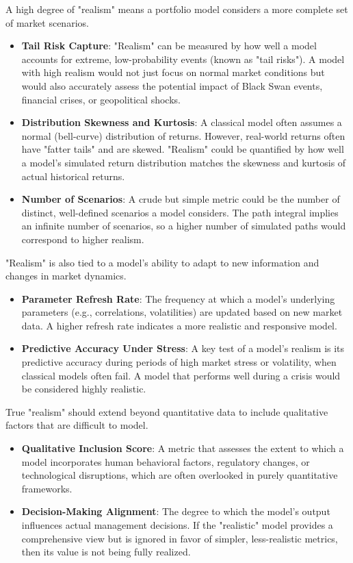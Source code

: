 \documentclass{article}
\begin{document}
 
 A high degree of "realism" means a portfolio model considers a more complete set of market scenarios.
 \begin{itemize}
 	\item \textbf{Tail Risk Capture}: "Realism" can be measured by how well a model accounts for extreme, low-probability events (known as "tail risks"). A model with high realism would not just focus on normal market conditions but would also accurately assess the potential impact of Black Swan events, financial crises, or geopolitical shocks.
 	\item \textbf{Distribution Skewness and Kurtosis}: A classical model often assumes a normal (bell-curve) distribution of returns. However, real-world returns often have "fatter tails" and are skewed. "Realism" could be quantified by how well a model's simulated return distribution matches the skewness and kurtosis of actual historical returns.
 	\item \textbf{Number of Scenarios}: A crude but simple metric could be the number of distinct, well-defined scenarios a model considers. The path integral implies an infinite number of scenarios, so a higher number of simulated paths would correspond to higher realism.
 \end{itemize}
 "Realism" is also tied to a model's ability to adapt to new information and changes in market dynamics.
 \begin{itemize}
 	\item \textbf{Parameter Refresh Rate}: The frequency at which a model's underlying parameters (e.g., correlations, volatilities) are updated based on new market data. A higher refresh rate indicates a more realistic and responsive model.
 	\item \textbf{Predictive Accuracy Under Stress}: A key test of a model's realism is its predictive accuracy during periods of high market stress or volatility, when classical models often fail. A model that performs well during a crisis would be considered highly realistic.
 \end{itemize}
 True "realism" should extend beyond quantitative data to include qualitative factors that are difficult to model.
 \begin{itemize}
 	\item \textbf{Qualitative Inclusion Score}: A metric that assesses the extent to which a model incorporates human behavioral factors, regulatory changes, or technological disruptions, which are often overlooked in purely quantitative frameworks.
 	\item \textbf{Decision-Making Alignment}: The degree to which the model's output influences actual management decisions. If the "realistic" model provides a comprehensive view but is ignored in favor of simpler, less-realistic metrics, then its value is not being fully realized.
 \end{itemize}
 
\end{document}
